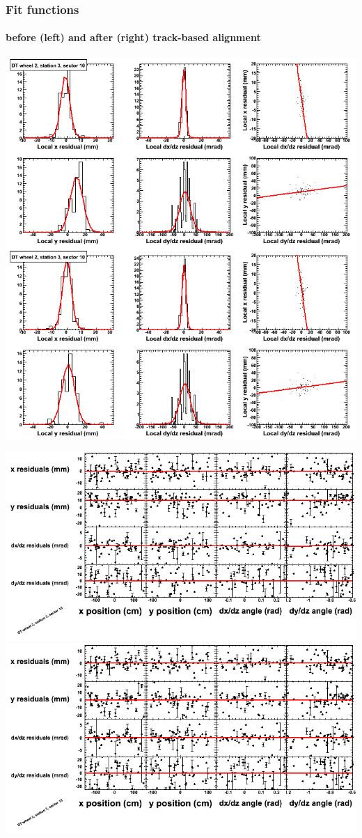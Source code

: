 \documentclass[compress]{beamer}
\begin{document}
\begin{frame}
\frametitle{Fit functions}
\framesubtitle{before (left) and after (right) track-based alignment}
\includegraphics[width=0.5\linewidth]{fitfunctions_re01/MBwhEst3sec10_bellcurves.png} \includegraphics[width=0.5\linewidth]{fitfunctions_re05/MBwhEst3sec10_bellcurves.png}

\includegraphics[width=0.5\linewidth]{fitfunctions_re01/MBwhEst3sec10_polynomials.png} \includegraphics[width=0.5\linewidth]{fitfunctions_re05/MBwhEst3sec10_polynomials.png}
\end{frame}
\end{document}
